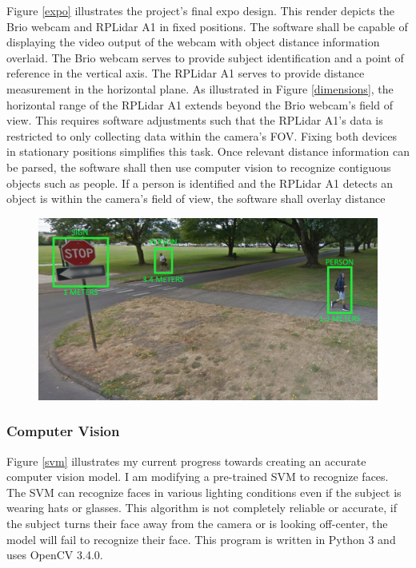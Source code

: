 \documentclass[onecolumn, draftclsnofoot,10pt, compsoc]{IEEEtran}
\begin{document}
\begin{singlespace}
			Figure \ref{expo} illustrates the project's final expo design.
			This render depicts the Brio webcam and RPLidar A1 in fixed positions.
			The software shall be capable of displaying the video output of the webcam with object distance information overlaid.
			The Brio webcam serves to provide subject identification and a point of reference in the vertical axis.
			The RPLidar A1 serves to provide distance measurement in the horizontal plane.
			As illustrated in Figure \ref{dimensions}, the horizontal range of the RPLidar A1 extends beyond the Brio webcam's field of view.
			This requires software adjustments such that the RPLidar A1's data is restricted to only collecting data within the camera's FOV.
			Fixing both devices in stationary positions simplifies this task.
			Once relevant distance information can be parsed, the software shall then use computer vision to recognize contiguous objects such as people.
			If a person is identified and the RPLidar A1 detects an object is within the camera's field of view, the software shall overlay distance 

			\begin{figure}[here]
				\includegraphics[scale=0.4]{overlay_design.png}
				\label{overlay}
			\end{figure}

		\subsubsection{Computer Vision}
			Figure \ref{svm} illustrates my current progress towards creating an accurate computer vision model.
			I am modifying a pre-trained SVM to recognize faces.
			The SVM can recognize faces in various lighting conditions even if the subject is wearing hats or glasses.
			This algorithm is not completely reliable or accurate, if the subject turns their face away from the camera or is looking off-center, the model will fail to recognize their face.
			This program is written in Python 3 and uses OpenCV 3.4.0. \cite{opencv}


\end{singlespace}
\end{document}
